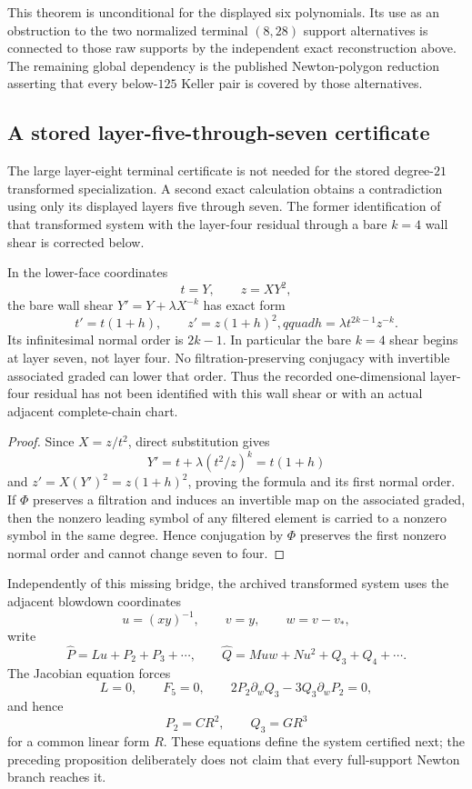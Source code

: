 This theorem is unconditional for the displayed six polynomials.  Its use
as an obstruction to the two normalized terminal \((8,28)\) support
alternatives is connected to those raw supports by the independent exact
reconstruction above.  The remaining global dependency is the published
Newton-polygon reduction asserting that every below-\(125\) Keller pair is
covered by those alternatives.

\subsection{A stored layer-five-through-seven certificate}
\label{subsec:two-chart-layer-seven}

The large layer-eight terminal certificate is not needed for the stored
degree-\(21\) transformed specialization.  A second exact calculation
obtains a contradiction using only its displayed layers five through seven.
The former identification of that transformed system with the layer-four
residual through a bare \(k=4\) wall shear is corrected below.

\begin{proposition}
\label{prop:k4-chart-transition}
In the lower-face coordinates
\[
t=Y,\qquad z=XY^2,
\]
the bare wall shear \(Y'=Y+\lambda X^{-k}\) has exact form
\[
t'=t(1+h),\qquad z'=z(1+h)^2,qquad
h=\lambda t^{2k-1}z^{-k}.
\]
Its infinitesimal normal order is \(2k-1\).  In particular the bare
\(k=4\) shear begins at layer seven, not layer four.  No
filtration-preserving conjugacy with invertible associated graded can lower
that order.  Thus the recorded one-dimensional layer-four residual has not
been identified with this wall shear or with an actual adjacent
complete-chain chart.
\end{proposition}

\begin{proof}
Since \(X=z/t^2\), direct substitution gives
\[
Y'=t+\lambda(t^2/z)^k=t(1+h)
\]
and \(z'=X(Y')^2=z(1+h)^2\), proving the formula and its first normal order.
If \(\Phi\) preserves a filtration and induces an invertible map on the
associated graded, then the nonzero leading symbol of any filtered element
is carried to a nonzero symbol in the same degree.  Hence conjugation by
\(\Phi\) preserves the first nonzero normal order and cannot change seven
to four.
\end{proof}

Independently of this missing bridge, the archived transformed system uses
the adjacent blowdown coordinates
\[
u=(xy)^{-1},\qquad v=y,\qquad w=v-v_*,
\]
write
\[
\widehat P=Lu+P_2+P_3+\cdots,\qquad
\widehat Q=Muw+Nu^2+Q_3+Q_4+\cdots.
\]
The Jacobian equation forces
\[
L=0,\qquad F_5=0,\qquad
2P_2\partial_wQ_3-3Q_3\partial_wP_2=0,
\]
and hence
\[
P_2=CR^2,\qquad Q_3=GR^3
\]
for a common linear form \(R\).  These equations define the system certified
next; the preceding proposition deliberately does not claim that every
full-support Newton branch reaches it.

